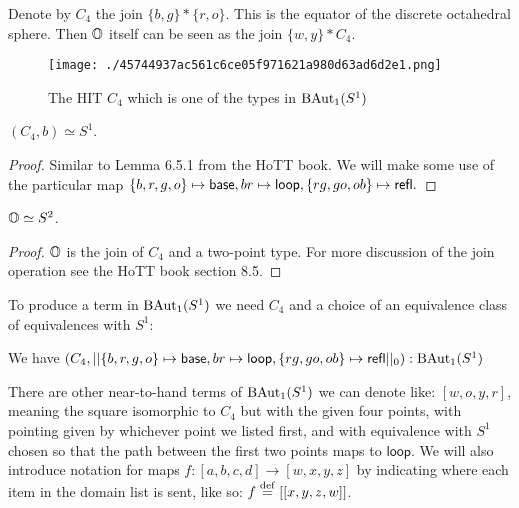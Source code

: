 \begin{mydef}
Denote by \( C_4 \) the join \( \{b, g\}*\{r, o\} \). This is the equator of the discrete octahedral sphere. Then \( \mathbb{O} \) itself can be seen as the join \( \{w, y\}* C_4 \).
\end{mydef}

\begin{figure}
\centering
\begin{minipage}[t]{0.45\linewidth}
\centering
\end{minipage}
\hfill
\begin{minipage}[t]{0.45\linewidth}
\texttt{[image: ./45744937ac561c6ce05f971621a980d63ad6d2e1.png]}
\end{minipage}
\caption{The HIT \(C_4\) which is one of the types in \(\mathrm{BAut}_1(S^1)\)}
\end{figure}

\begin{mylemma}
\( (C_4, b)\simeq S^1 \).
\end{mylemma}

\emph{Proof.} Similar to Lemma 6.5.1 from the HoTT book\cite{hottbook}.
We will make some use of the particular map
\(\{b, r, g, o\}\mapsto \mathsf{base}, br\mapsto \mathsf{loop}, \{rg, go, ob\}\mapsto \mathsf{refl}.\)~◻

\begin{mylemma}
\( \mathbb{O}\simeq S^2 \).
\end{mylemma}

\emph{Proof.} \(\mathbb{O}\) is the join of \(C_4\) and a two-point type. For
more discussion of the join operation see the HoTT book section
8.5\cite{hottbook}.~◻

To produce a term in \(\mathrm{BAut}_1(S^1)\) we need \(C_4\) and a choice of an
equivalence class of equivalences with \(S^1\):

\begin{mylemma}
We have \( (C_4, ||\{b, r, g, o\}\mapsto \mathsf{base}, br\mapsto \mathsf{loop}, \{rg, go, ob\}\mapsto \mathsf{refl} ||_0):\mathrm{BAut}_1(S^1) \)
\end{mylemma}

There are other near-to-hand terms of \(\mathrm{BAut}_1(S^1)\) we can denote like:
\([w, o, y, r]\), meaning the square isomorphic to \(C_4\) but with the
given four points, with pointing given by whichever point we listed
first, and with equivalence with \(S^1\) chosen so that the path between
the first two points maps to \(\mathsf{loop}\). We will also introduce
notation for maps \(f:[a, b, c, d]\to [w, x, y, z]\) by indicating where
each item in the domain list is sent, like so:
\(f\stackrel{\mathrm{def}}{=}[[x, y, z, w]]\).

